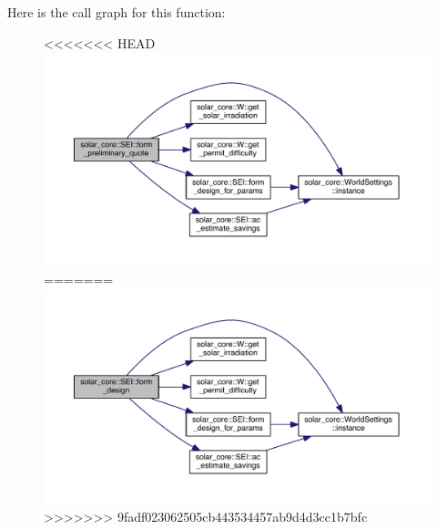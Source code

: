 Here is the call graph for this function\+:
\nopagebreak
\begin{figure}[H]
\begin{center}
\leavevmode
<<<<<<< HEAD
\includegraphics[width=350pt]{classsolar__core_1_1_s_e_i_af598032ee3e4506cf5123aceee67cbfd_cgraph}
=======
\includegraphics[width=350pt]{classsolar__core_1_1_s_e_i_a807561ad055ddc0df91b80ba406ee6df_cgraph}
>>>>>>> 9fadf023062505cb443534457ab9d4d3cc1b7bfc
\end{center}
\end{figure}




